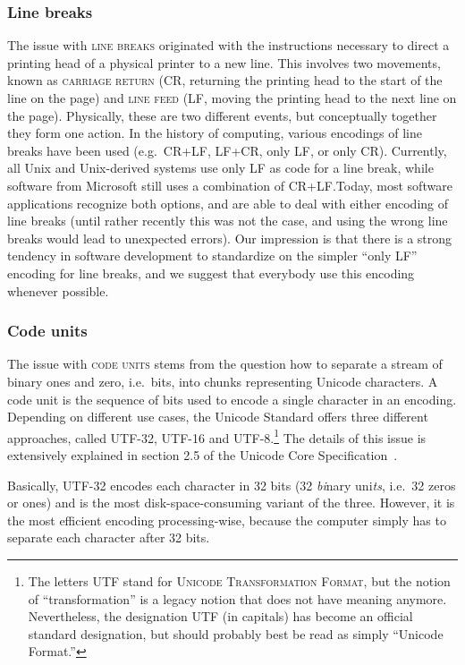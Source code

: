 \subsubsection*{Line breaks}

The issue with \textsc{line breaks} originated with the instructions necessary
to direct a printing head of a physical printer to a new line. This involves two
movements, known as \textsc{carriage return} (CR, returning the printing head to
the start of the line on the page) and \textsc{line feed} (LF, moving the
printing head to the next line on the page). Physically, these are two different
events, but conceptually together they form one action. In the history of
computing, various encodings of line breaks have been used (e.g.~CR+LF, LF+CR,
only LF, or only CR). Currently, all Unix and Unix-derived systems use only LF
as code for a line break, while software from Microsoft still uses a combination
of CR+LF.\@ Today, most software applications recognize both options, and
are able to deal with either encoding of line breaks (until rather recently this
was not the case, and using the wrong line breaks would lead to unexpected
errors). Our impression is that there is a strong tendency in software
development to standardize on the simpler ``only LF'' encoding for line
breaks, and we suggest that everybody use this encoding whenever possible.

\subsubsection*{Code units}

The issue with \textsc{code units} stems from the question how to separate a
stream of binary ones and zero, i.e.~bits, into chunks representing Unicode
characters. A code unit is the sequence of bits used to encode a single
character in an encoding. Depending on different use cases, the Unicode Standard
offers three different approaches, called UTF-32, UTF-16 and UTF-8.\footnote{The
letters UTF stand for \textsc{Unicode Transformation Format}, but the notion of
``transformation'' is a legacy notion that does not have meaning anymore.
Nevertheless, the designation UTF (in capitals) has become an official
standard designation, but should probably best be read as simply ``Unicode
Format.''} The details of this issue is extensively explained in section 2.5 of
the Unicode Core Specification~\citet{Unicode2014}. 

Basically, \textsc{UTF-32} encodes each character in 32 bits (32 \textit{bi}nary
uni\textit{ts}, i.e.~32 zeros or ones) and is the most disk-space-consuming
variant of the three. However, it is the most efficient encoding
processing-wise, because the computer simply has to separate each character
after 32 bits. 

